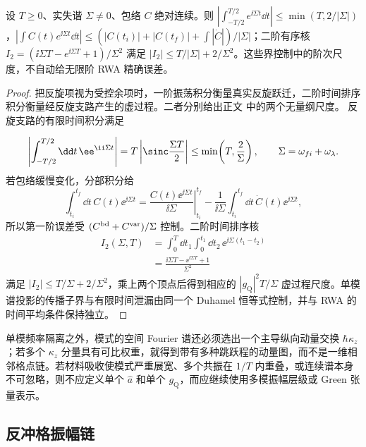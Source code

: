 \begin{lemma}[有限时间振荡积分的两阶界]
设 $T\ge0$、实失谐 $\Sigma\ne0$、包络 $C$ 绝对连续。则 $|\int_{-T/2}^{T/2}e^{\ii\Sigma t}\dd t|\le\min(T,2/|\Sigma|)$，$|\int C(t)e^{\ii\Sigma t}\dd t|\le(|C(t_i)|+|C(t_f)|+\int|\dot C|)/|\Sigma|$；二阶有序核 $I_2=(\ii\Sigma T-e^{\ii\Sigma T}+1)/\Sigma^2$ 满足 $|I_2|\le T/|\Sigma|+2/\Sigma^2$。这些界控制中的阶次尺度，不自动给无限阶 RWA 精确误差。
\end{lemma}
\begin{proof}
把反旋项视为受控余项时，一阶振荡积分衡量真实反旋跃迁，二阶时间排序积分衡量经反旋支路产生的虚过程。二者分别给出正文 中的两个无量纲尺度。 反旋支路的有限时间积分满足

\begin{equation*}
\left|\int_{-T/2}^{T/2}\dd t\,\ee^{\ii\Sigma t}\right|
=T\left|\sinc\frac{\Sigma T}{2}\right|
\le\min\!\left(T,\frac{2}{\Sigma}\right),
\qquad \Sigma=\omega_{fi}+\omega_\lambda.
\end{equation*}
若包络缓慢变化，分部积分给
\begin{equation*}
\int_{t_i}^{t_f}\dd t\,C(t)\ee^{\ii\Sigma t}
=\left.\frac{C(t)\ee^{\ii\Sigma t}}{\ii\Sigma}\right|_{t_i}^{t_f}
-\frac1{\ii\Sigma}\int_{t_i}^{t_f}\dd t\,\dot C(t)\ee^{\ii\Sigma t},
\end{equation*}
所以第一阶误差受 $(C^{\rm bd}+C^{\rm var})/\Sigma$ 控制。二阶时间排序核
\begin{align*}
I_2(\Sigma,T)
&=\int_0^T\dd t_1\int_0^{t_1}\dd t_2\,
\ee^{\ii\Sigma(t_1-t_2)}\\
&=\frac{\ii\Sigma T-\ee^{\ii\Sigma T}+1}{\Sigma^2}
\end{align*}
满足 $|I_2|\le T/\Sigma+2/\Sigma^2$，乘上两个顶点后得到相应的 $|g_{\mathrm Q}|^2T/\Sigma$ 虚过程尺度。单模谱投影的传播子界与有限时间泄漏由同一个 Duhamel 恒等式控制，并与 RWA 的时间平均条件保持独立。
\end{proof}


单模频率隔离之外，模式的空间 Fourier 谱还必须选出一个主导纵向动量交换 $\hbar \kappa_z$；若多个 $\kappa_z$ 分量具有可比权重，就得到带有多种跳跃程的动量图，而不是一维相邻格点链。若材料吸收使模式严重展宽、多个共振在 $1/T$ 内重叠，或连续谱本身不可忽略，则不应定义单个 $\hat a$ 和单个 $g_{\mathrm Q}$，而应继续使用多模振幅层级或 Green 张量表示。

\subsection{反冲格振幅链}

